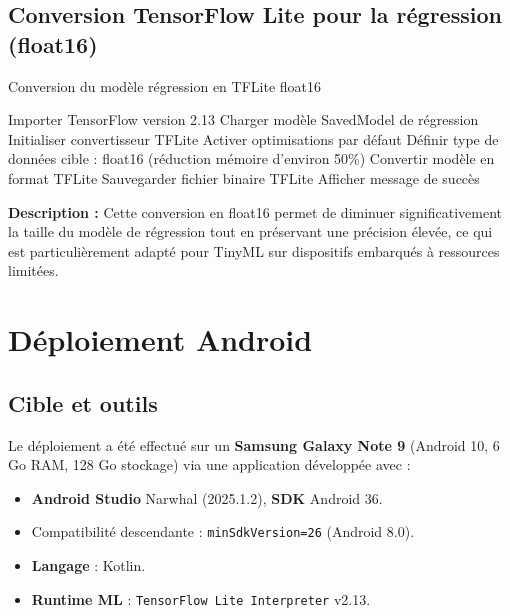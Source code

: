 \bigskip

\subsection*{Conversion TensorFlow Lite pour la régression (float16)}

\begin{algorithm}[H]
\caption{Conversion du modèle régression en TFLite float16}

Importer TensorFlow version 2.13\;
Charger modèle SavedModel de régression\;
Initialiser convertisseur TFLite\;
Activer optimisations par défaut\;
Définir type de données cible : float16 (réduction mémoire d'environ 50\%)\;
Convertir modèle en format TFLite\;
Sauvegarder fichier binaire TFLite\;
Afficher message de succès\;
\end{algorithm}

\vspace{5mm}

\noindent\textbf{Description :} Cette conversion en float16 permet de diminuer significativement la taille du modèle de régression tout en préservant une précision élevée, ce qui est particulièrement adapté pour TinyML sur dispositifs embarqués à ressources limitées.

\section{Déploiement Android}
\label{sec:deploiement_android}

\subsection{Cible et outils}
Le déploiement a été effectué sur un \textbf{Samsung Galaxy Note 9} (Android 10, 6 Go RAM, 128 Go stockage) via une application développée avec :
\begin{itemize}
    \item \textbf{Android Studio} Narwhal (2025.1.2), \textbf{SDK} Android 36.
    \item Compatibilité descendante : \texttt{minSdkVersion=26} (Android 8.0).
    \item \textbf{Langage} : Kotlin.
    \item \textbf{Runtime ML} : \texttt{TensorFlow Lite Interpreter} v2.13.
\end{itemize}


